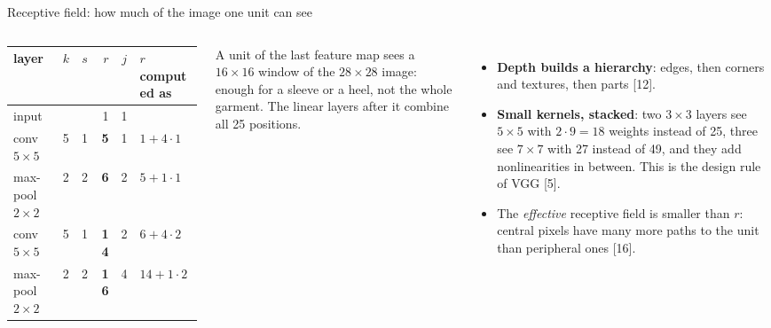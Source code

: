 \documentclass[aspectratio=169,10pt]{beamer}
\renewcommand{\cite}[1]{{\scriptsize\color{cTok}[#1]}}
\newcommand{\key}[1]{\textbf{\color{cAtt}#1}}
\newcommand{\num}[1]{\textbf{\color{cEmb}#1}}
\begin{document}
\begin{frame}{Receptive field: how much of the image one unit can see}
\begin{columns}[T,onlytextwidth]
\vspace{0.5mm}
{\footnotesize
\renewcommand{\arraystretch}{1.12}
\begin{tabular}{@{}lccrcl@{}}
\toprule
layer & $k$ & $s$ & $r$ & $j$ & $r$ computed as\\
\midrule
input & & & 1 & 1 & \\
conv $5\times5$ & 5 & 1 & \num{5} & 1 & $1+4\cdot1$\\
max-pool $2\times2$ & 2 & 2 & \num{6} & 2 & $5+1\cdot1$\\
conv $5\times5$ & 5 & 1 & \num{14} & 2 & $6+4\cdot2$\\
max-pool $2\times2$ & 2 & 2 & \num{16} & 4 & $14+1\cdot2$\\
\bottomrule
\end{tabular}}

\vspace{1.5mm}
{\footnotesize A unit of the last feature map sees a $16\times16$ window of the $28\times28$ image:
enough for a sleeve or a heel, not the whole garment. The linear layers after it combine all 25 positions.}

\vspace{1mm}
\begin{itemize}\footnotesize
  \item \key{Depth builds a hierarchy}: edges, then corners and textures, then parts \cite{12}.
  \item \key{Small kernels, stacked}: two $3\times3$ layers see $5\times5$ with $2\cdot9=18$ weights instead of 25,
        three see $7\times7$ with 27 instead of 49, and they add nonlinearities in between.
        This is the design rule of VGG \cite{5}.
  \item The \emph{effective} receptive field is smaller than $r$: central pixels have many more paths to the
        unit than peripheral ones \cite{16}.
\end{itemize}
\end{columns}
\end{frame}
\end{document}
